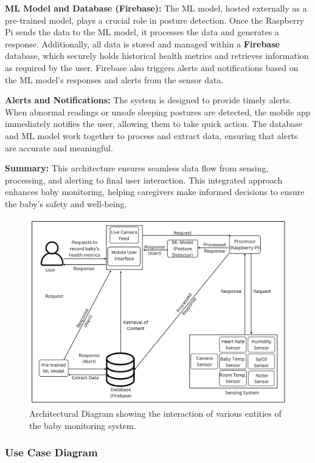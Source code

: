 \documentclass[conference]{IEEEtran}
\begin{document}
\textbf{ML Model and Database (Firebase):} The ML model, hosted externally as a pre-trained model, plays a crucial role in posture detection. Once the Raspberry Pi sends the data to the ML model, it processes the data and generates a response. Additionally, all data is stored and managed within a \textbf{Firebase} database, which securely holds historical health metrics and retrieves information as required by the user. Firebase also triggers alerts and notifications based on the ML model’s responses and alerts from the sensor data.

\textbf{Alerts and Notifications:} The system is designed to provide timely alerts. When abnormal readings or unsafe sleeping postures are detected, the mobile app immediately notifies the user, allowing them to take quick action. The database and ML model work together to process and extract data, ensuring that alerts are accurate and meaningful.

\textbf{Summary:} This architecture ensures seamless data flow from sensing, processing, and alerting to final user interaction. This integrated approach enhances baby monitoring, helping caregivers make informed decisions to ensure the baby's safety and well-being.


\begin{figure}[hbtp]
  \centering
  \includegraphics[scale=0.3]{./pic/finarch.png}
  \caption{Architectural Diagram showing the interaction of various entities of the baby monitoring system.}
  \label{fig:architecture}
\end{figure}
\subsubsection{Use Case Diagram}
\end{document}
